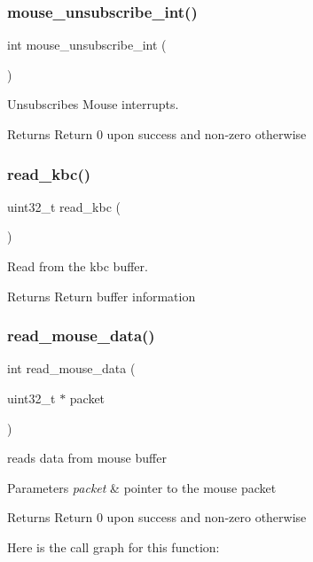 \subsubsection{\texorpdfstring{mouse\_unsubscribe\_int()}{mouse\_unsubscribe\_int()}}
{\footnotesize\ttfamily int mouse\+\_\+unsubscribe\+\_\+int (\begin{DoxyParamCaption}{ }\end{DoxyParamCaption})}



Unsubscribes Mouse interrupts. 

\begin{DoxyReturn}{Returns}
Return 0 upon success and non-\/zero otherwise 
\end{DoxyReturn}
\mbox{\label{group__mouse_gad82d7239d54c89cbccd5c7e8f742973d}} 
\subsubsection{\texorpdfstring{read\_kbc()}{read\_kbc()}}
{\footnotesize\ttfamily uint32\+\_\+t read\+\_\+kbc (\begin{DoxyParamCaption}{ }\end{DoxyParamCaption})}



Read from the kbc buffer. 

\begin{DoxyReturn}{Returns}
Return buffer information 
\end{DoxyReturn}
\mbox{\label{group__mouse_ga41c4d2b9b295568179b689915a8acfa8}} 
\subsubsection{\texorpdfstring{read\_mouse\_data()}{read\_mouse\_data()}}
{\footnotesize\ttfamily int read\+\_\+mouse\+\_\+data (\begin{DoxyParamCaption}\item[{uint32\+\_\+t $\ast$}]{packet }\end{DoxyParamCaption})}



reads data from mouse buffer 


\begin{DoxyParams}{Parameters}
{\em packet} & pointer to the mouse packet \\
\hline
\end{DoxyParams}
\begin{DoxyReturn}{Returns}
Return 0 upon success and non-\/zero otherwise 
\end{DoxyReturn}
Here is the call graph for this function\+:
\mbox{\label{group__mouse_ga775294026ae46cbb8e4a5d376c0111a2}} 
